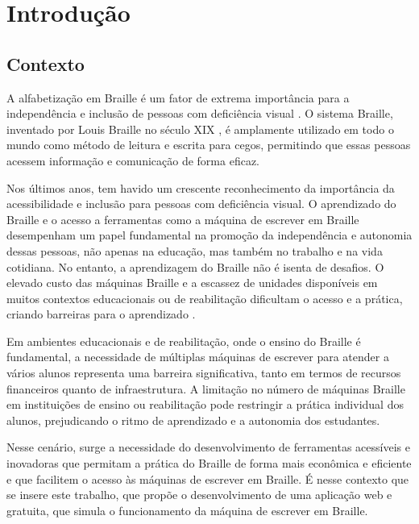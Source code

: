 % 
\chapter{Introdução} %
\label{chap:Chapter01} %
%

\section{Contexto} 
\label{sec:chap01_context} %

A alfabetização em Braille é um fator de extrema importância para a independência e inclusão de pessoas com deficiência visual \parencite{REF01}. O sistema Braille, inventado por Louis Braille no século XIX \parencite{REF02}, é amplamente utilizado em todo o mundo como método de leitura e escrita para cegos, permitindo que essas pessoas acessem informação e comunicação de forma eficaz.

Nos últimos anos, tem havido um crescente reconhecimento da importância da acessibilidade e inclusão para pessoas com deficiência visual. O aprendizado do Braille e o acesso a ferramentas como a máquina de escrever em Braille desempenham um papel fundamental na promoção da independência e autonomia dessas pessoas, não apenas na educação, mas também no trabalho e na vida cotidiana. No entanto, a aprendizagem do Braille não é isenta de desafios. O elevado custo das máquinas Braille e a escassez de unidades disponíveis em muitos contextos educacionais ou de reabilitação dificultam o acesso e a prática, criando barreiras para o aprendizado \parencite{REF01}.

Em ambientes educacionais e de reabilitação, onde o ensino do Braille é fundamental, a necessidade de múltiplas máquinas de escrever para atender a vários alunos representa uma barreira significativa, tanto em termos de recursos financeiros quanto de infraestrutura. A limitação no número de máquinas Braille em instituições de ensino ou reabilitação pode restringir a prática individual dos alunos, prejudicando o ritmo de aprendizado e a autonomia dos estudantes.

Nesse cenário, surge a necessidade do desenvolvimento de ferramentas acessíveis e inovadoras que permitam a prática do Braille de forma mais econômica e eficiente e que facilitem o acesso às máquinas de escrever em Braille. É nesse contexto que se insere este trabalho, que propõe o desenvolvimento de uma aplicação web e gratuita, que simula o funcionamento da máquina de escrever em Braille.


